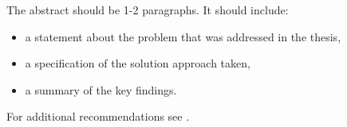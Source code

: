 The abstract should be 1-2 paragraphs. It should include:
\begin{itemize}
 \item a statement about the problem that was addressed in the thesis,
 \item a specification of the solution approach taken,
 \item a summary of the key findings. 
\end{itemize}

For additional recommendations see \cite{wallwork_177}. 

\noindent
